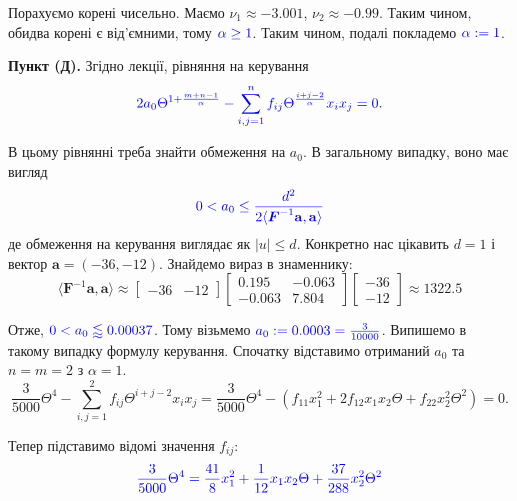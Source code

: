 \documentclass{hw_template}
\begin{document}
Порахуємо корені чисельно. Маємо $\nu_1 \approx -3.001$, $\nu_2 \approx -0.99$. Таким чином, 
обидва корені є від'ємними, тому $\textcolor{blue}{\alpha \geq 1}$. Таким чином, подалі покладемо $\textcolor{blue}{\alpha:=1}$.

\textbf{Пункт (Д).} Згідно лекції, рівняння на керування
\begin{equation*}
    \textcolor{blue}{2a_0\Theta^{1+\frac{m+n-1}{\alpha}} - \sum_{i,j=1}^n f_{ij}\Theta^{\frac{i+j-2}{\alpha}}x_ix_j = 0.}
\end{equation*}

В цьому рівнянні треба знайти обмеження на $a_0$. В загальному випадку, воно має
вигляд 
\begin{equation*}
    \textcolor{blue}{0 < a_0 \leq \frac{d^2}{2\langle\boldsymbol{F}^{-1}\mathbf{a},\mathbf{a}\rangle}}
\end{equation*}
де обмеження на керування виглядає як $|u| \leq d$. Конкретно нас цікавить $d=1$ і вектор
$\mathbf{a} = (-36, -12)$. Знайдемо вираз в знаменнику:
\begin{equation*}
    \langle\boldsymbol{F}^{-1}\mathbf{a},\mathbf{a}\rangle \approx \begin{bmatrix}
        -36 & -12
    \end{bmatrix}\begin{bmatrix}
        0.195 & -0.063 \\
        -0.063 & 7.804
    \end{bmatrix}\begin{bmatrix}
        -36 \\ -12
    \end{bmatrix} \approx 1322.5
\end{equation*}

Отже, $\textcolor{blue}{0 < a_0 \lessapprox 0.00037}$. Тому візьмемо
$\textcolor{blue}{a_0 := 0.0003=\frac{3}{10000}}$. Випишемо в такому випадку 
формулу керування. Спочатку відставимо отриманий $a_0$ та $n=m=2$ з $\alpha=1$.
\begin{equation*}
    \frac{3}{5000}\Theta^4 - \sum_{i,j=1}^2 f_{ij}\Theta^{i+j-2}x_ix_j = \frac{3}{5000}\Theta^4 - (f_{11}x_1^2 + 2f_{12}x_1x_2\Theta + f_{22}x_2^2\Theta^2) = 0.
\end{equation*}

Тепер підставимо відомі значення $f_{ij}$:
\begin{equation*}
    \textcolor{blue}{\frac{3}{5000}\Theta^4 = \frac{41}{8}x_1^2 + \frac{1}{12}x_1x_2\Theta + \frac{37}{288}x_2^2\Theta^2}
\end{equation*}
\end{document}
